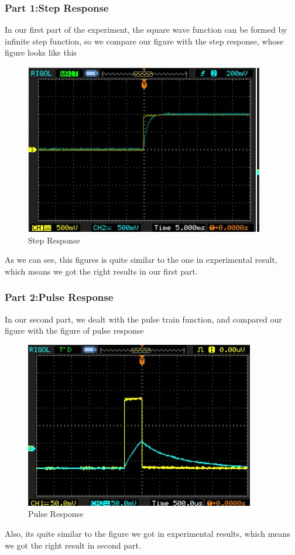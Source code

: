 \documentclass[12pt]{article}
\begin{document}
\subsubsection{Part 1:Step Response}
In our first part of the experiment, the square wave function can be formed by infinite step function, so we compare our figure with the step response, whose figure looks like this
\begin{figure}[H]
\centering
\includegraphics[scale=1]{p6.jpg}
\caption{Step Response}
\end{figure}
As we can see, this figures is quite similar to the one in experimental result, which means we got the right results in our first part.
\subsubsection{Part 2:Pulse Response}
In our second part, we dealt with the pulse train function, and compared our figure with the figure of pulse response
\begin{figure}[H]
\centering
\includegraphics[scale=1]{p7.jpg}
\caption{Pulse Response}
\end{figure}
Also, its quite similar to the figure we got in experimental results, which means we got the right result in second part.
\end{document}
